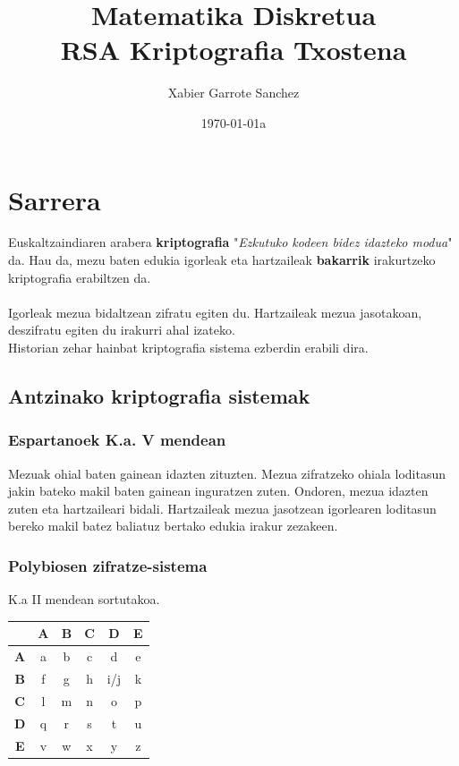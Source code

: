 \documentclass[12pt]{basque-book}
\begin{document}
\title{ \textbf{Matematika Diskretua\\ RSA Kriptografia Txostena} }

\author{Xabier Garrote Sanchez}

\date{\today a}


\maketitle
\newpage
\tableofcontents
\newpage


\chapter{Sarrera}
Euskaltzaindiaren arabera \textbf{kriptografia} "\textit{Ezkutuko kodeen bidez idazteko modua}" da. Hau da, mezu baten edukia igorleak eta hartzaileak \textbf{bakarrik} irakurtzeko kriptografia erabiltzen da.
\\\\
Igorleak mezua bidaltzean zifratu egiten du. Hartzaileak mezua jasotakoan, deszifratu egiten du irakurri ahal izateko. 
\\
Historian zehar hainbat kriptografia sistema ezberdin erabili dira.

\section{Antzinako kriptografia sistemak}
\subsection{Espartanoek K.a. V mendean} Mezuak ohial baten gainean idazten zituzten. Mezua zifratzeko ohiala loditasun jakin bateko makil baten gainean inguratzen zuten. Ondoren, mezua idazten zuten eta hartzaileari bidali. Hartzaileak mezua jasotzean igorlearen loditasun bereko makil batez baliatuz bertako edukia irakur zezakeen.


\newpage


\subsection{Polybiosen zifratze-sistema}  K.a II mendean sortutakoa. 
\begin{center}
    \begin{tabular}{ c |c |c| c| c| c| }
        & \textbf{A}  & \textbf{B} & \textbf{C} & \textbf{D} & \textbf{E} \\
         \hline
        \textbf{A}  &a  & b & c & d & e \\ 
        \hline
        \textbf{B}  &f  & g & h & i/j & k\\  
        \hline
        \textbf{C}  & l  & m & n & o & p \\
        \hline
        \textbf{D}  & q  & r & s & t & u\\
        \hline
        \textbf{E}  & v  & w & x & y & z
    \end{tabular}
\end{center}
\end{document}
